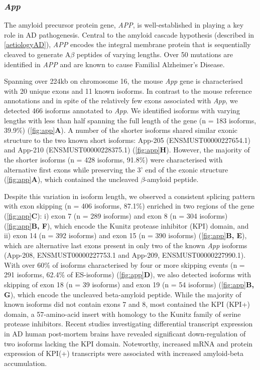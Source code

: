 \newpage
\subsubsection{\textit{App}}
The amyloid precursor protein gene, \textit{APP}, is well-established in playing a key role in AD pathogenesis. Central to the amyloid cascade hypothesis (described in \cref{aetiologyAD}), \textit{APP} encodes the integral membrane protein that is sequentially cleaved to generate A$\beta$ peptides of varying lengths. Over 50 mutations are identified in \textit{APP} and are known to cause Familial Alzheimer's Disease\cite{Li2019,D1996,JT1993}. 

Spanning over 224kb on chromosome 16, the mouse \textit{App} gene is characterised with 20 unique exons and 11 known isoforms. In contrast to the mouse reference annotations and in spite of the relatively few exons associated with \textit{App}, we detected 466 isoforms annotated to \textit{App}. We identified isoforms with varying lengths with less than half spanning the full length of the gene (n = 183 isoforms, 39.9\%) (\cref{fig:app}\textbf{A}). A number of the shorter isoforms shared similar exonic structure to the two known short isoforms: App-205 (ENSMUST00000227654.1) and App-210 (ENSMUST00000228375.1) (\cref{fig:app}\textbf{H}). However, the majority of the shorter isoforms (n = 428 isoforms, 91.8\%) were characterised with alternative first exons while preserving the 3' end of the exonic structure (\cref{fig:app}\textbf{A}), which contained the uncleaved $\beta$-amyloid peptide. 

Despite this variation in isoform length, we observed a consistent splicing pattern with exon skipping (n = 406 isoforms, 87.1\%) enriched in two regions of the gene (\cref{fig:app}\textbf{C}): i) exon 7 (n = 289 isoforms) and exon 8 (n = 304 isoforms) (\cref{fig:app}\textbf{B, F}), which encode the Kunitz protease inhibitor (KPI) domain, and ii) exon 14 (n = 392 isoforms) and exon 15 (n = 390 isoforms) (\cref{fig:app}\textbf{B, E}), which are alternative last exons present in only two of the known \textit{App} isoforms (App-208, ENSMUST00000227753.1 and App-209, ENSMUST00000227990.1). With over 60\% of isoforms characterised by four or more skipping events (n = 291 isoforms, 62.4\% of ES-isoforms) (\cref{fig:app}\textbf{D}), we also detected isoforms with skipping of exon 18 (n = 39 isoforms) and exon 19 (n = 54 isoforms) (\cref{fig:app}\textbf{B, G}), which encode the uncleaved beta-amyloid peptide. While the majority of known isoforms did not contain exons 7 and 8, most contained the KPI (KPI+) domain, a 57-amino-acid insert with homology to the Kunitz family of serine protease inhibitors. Recent studies investigating differential transcript expression in AD human post-mortem brains have revealed significant down-regulation of two isoforms lacking the KPI domain\cite{Marques-Coelho2021}. Noteworthy, increased mRNA and protein expression of KPI(+) transcripts were associated with increased amyloid-beta accumulation\cite{Zhang2011}. 

